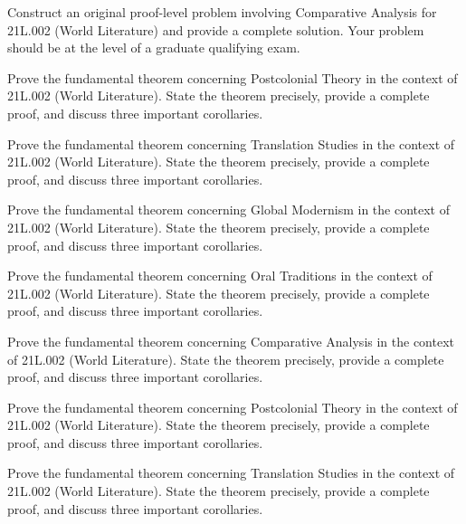 \documentclass[12pt,a4paper]{exam}
\begin{document}
\begin{questions}

\question[2]
Construct an original proof-level problem involving Comparative Analysis for 21L.002 (World Literature) and provide a complete solution. Your problem should be at the level of a graduate qualifying exam.

\vspace{0.3cm}

\question[2]
Prove the fundamental theorem concerning Postcolonial Theory in the context of 21L.002 (World Literature). State the theorem precisely, provide a complete proof, and discuss three important corollaries.

\vspace{0.3cm}

\question[9]
Prove the fundamental theorem concerning Translation Studies in the context of 21L.002 (World Literature). State the theorem precisely, provide a complete proof, and discuss three important corollaries.

\vspace{0.3cm}

\question[3]
Prove the fundamental theorem concerning Global Modernism in the context of 21L.002 (World Literature). State the theorem precisely, provide a complete proof, and discuss three important corollaries.

\vspace{0.3cm}

\question[9]
Prove the fundamental theorem concerning Oral Traditions in the context of 21L.002 (World Literature). State the theorem precisely, provide a complete proof, and discuss three important corollaries.

\vspace{0.3cm}

\question[2]
Prove the fundamental theorem concerning Comparative Analysis in the context of 21L.002 (World Literature). State the theorem precisely, provide a complete proof, and discuss three important corollaries.

\vspace{0.3cm}

\question[3]
Prove the fundamental theorem concerning Postcolonial Theory in the context of 21L.002 (World Literature). State the theorem precisely, provide a complete proof, and discuss three important corollaries.

\vspace{0.3cm}

\question[5]
Prove the fundamental theorem concerning Translation Studies in the context of 21L.002 (World Literature). State the theorem precisely, provide a complete proof, and discuss three important corollaries.


\end{questions}
\end{document}
